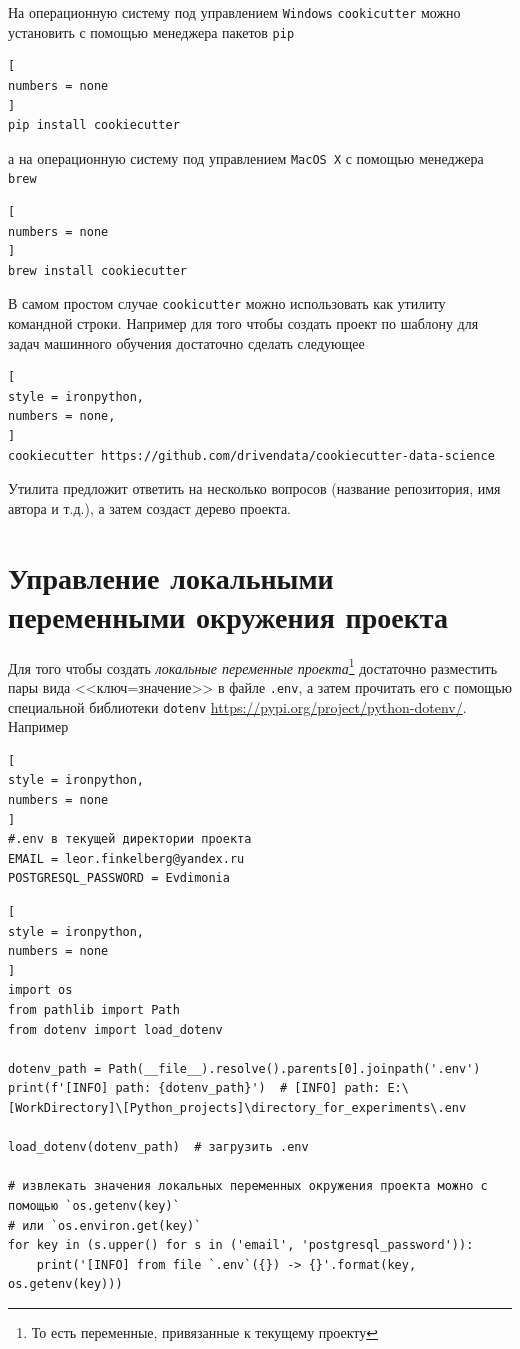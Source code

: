 \documentclass[%
	11pt,
	a4paper,
	utf8,
		]{article}
\begin{document}
На операционную систему под управлением \texttt{Windows} \texttt{cookicutter} можно установить с помощью менеджера пакетов \texttt{pip}

\begin{lstlisting}[
numbers = none
]
pip install cookiecutter
\end{lstlisting} 
а на операционную систему под управлением \texttt{MacOS X} с помощью менеджера \texttt{brew}

\begin{lstlisting}[
numbers = none
]
brew install cookiecutter
\end{lstlisting}

В самом простом случае \texttt{cookicutter} можно использовать как утилиту командной строки. Например для того чтобы создать проект по шаблону для задач машинного обучения достаточно сделать следующее

\begin{lstlisting}[
style = ironpython,
numbers = none,
]
cookiecutter https://github.com/drivendata/cookiecutter-data-science
\end{lstlisting}

Утилита предложит ответить на несколько вопросов (название репозитория, имя автора и т.д.), а затем создаст дерево проекта.

\section{Управление локальными переменными окружения проекта}

Для того чтобы создать \emph{локальные переменные проекта}\footnote{То есть переменные, привязанные к текущему проекту} достаточно разместить пары вида <<ключ=значение>> в файле \texttt{.env}, а затем прочитать его с помощью специальной библиотеки \texttt{dotenv} \url{https://pypi.org/project/python-dotenv/}. Например

\begin{lstlisting}[
style = ironpython,
numbers = none
]
#.env в текущей директории проекта
EMAIL = leor.finkelberg@yandex.ru
POSTGRESQL_PASSWORD = Evdimonia
\end{lstlisting}

\begin{lstlisting}[
style = ironpython,
numbers = none
]
import os
from pathlib import Path
from dotenv import load_dotenv

dotenv_path = Path(__file__).resolve().parents[0].joinpath('.env')
print(f'[INFO] path: {dotenv_path}')  # [INFO] path: E:\[WorkDirectory]\[Python_projects]\directory_for_experiments\.env

load_dotenv(dotenv_path)  # загрузить .env

# извлекать значения локальных переменных окружения проекта можно с помощью `os.getenv(key)`
# или `os.environ.get(key)`
for key in (s.upper() for s in ('email', 'postgresql_password')):
    print('[INFO] from file `.env`({}) -> {}'.format(key, os.getenv(key)))
\end{lstlisting}
\end{document}
